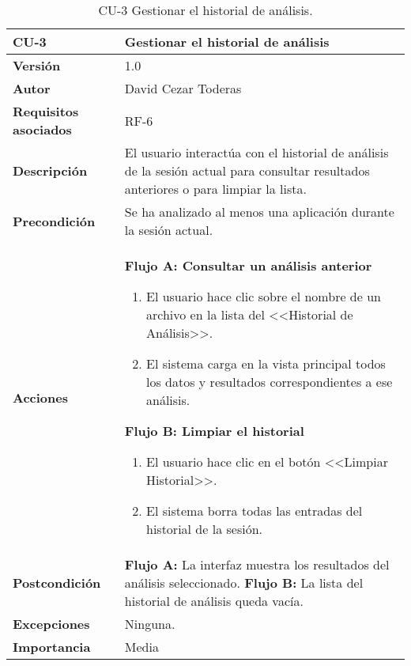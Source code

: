 \begin{table}[H]
	\centering
	\begin{tabularx}{\linewidth}{ p{} p{} }
		\toprule
		\textbf{CU-3}    & \textbf{Gestionar el historial de análisis}\\
		\toprule
		\textbf{Versión}              & 1.0    \\
		\textbf{Autor}                & David Cezar Toderas \\
		\textbf{Requisitos asociados} & RF-6 \\
		\textbf{Descripción}          & El usuario interactúa con el historial de análisis de la sesión actual para consultar resultados anteriores o para limpiar la lista. \\
		\textbf{Precondición}         & Se ha analizado al menos una aplicación durante la sesión actual. \\
		\textbf{Acciones}             &
		\textbf{Flujo A: Consultar un análisis anterior}
		\begin{enumerate}
			\def\labelenumi{\arabic{enumi}.}
			\tightlist
			\item El usuario hace clic sobre el nombre de un archivo en la lista del <<Historial de Análisis>>.
			\item El sistema carga en la vista principal todos los datos y resultados correspondientes a ese análisis.
		\end{enumerate}
		\textbf{Flujo B: Limpiar el historial}
		\begin{enumerate}
			\def\labelenumi{\arabic{enumi}.}
			\tightlist
			\item El usuario hace clic en el botón <<Limpiar Historial>>.
			\item El sistema borra todas las entradas del historial de la sesión.
		\end{enumerate}\\
		\textbf{Postcondición}        & \textbf{Flujo A:} La interfaz muestra los resultados del análisis seleccionado. \newline \textbf{Flujo B:} La lista del historial de análisis queda vacía. \\
		\textbf{Excepciones}          & Ninguna. \\
		\textbf{Importancia}          & Media \\
		\bottomrule
	\end{tabularx}
	\caption{CU-3 Gestionar el historial de análisis.}
\end{table}

